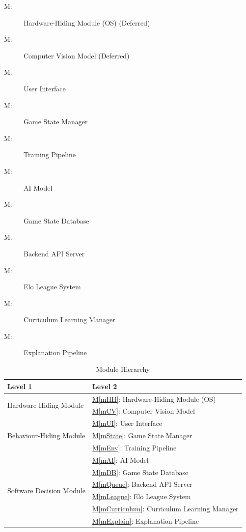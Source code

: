 \documentclass[12pt, titlepage]{article}
\newcounter{mnum}
\newcommand{\mthemnum}{M\themnum}
\newcommand{\mref}[1]{\hyperref[sec:#1]{M\ref*{#1}}}
\begin{document}
\begin{description}
\item [ \mthemnum \label{mHH}:] Hardware-Hiding Module (OS) (Deferred)
\item [ \mthemnum \label{mCV}:] Computer Vision Model (Deferred)
\item [ \mthemnum \label{mUI}:] User Interface
\item [ \mthemnum \label{mState}:] Game State Manager
\item [ \mthemnum \label{mEnv}:] Training Pipeline
\item [ \mthemnum \label{mAI}:] AI Model
\item [ \mthemnum \label{mDB}:] Game State Database
\item [ \mthemnum \label{mQueue}:] Backend API Server
\item [ \mthemnum \label{mLeague}:] Elo League System
\item [ \mthemnum \label{mCurriculum}:] Curriculum Learning Manager
\item [ \mthemnum \label{mExplain}:] Explanation Pipeline
\end{description}

\begin{table}[h!]
\centering
\caption{Module Hierarchy}
\label{TblMH}
\begin{tabular}{p{} p{}}
\toprule
\textbf{Level 1} & \textbf{Level 2}\\
\midrule

\multirow{2}{0.3\textwidth}{Hardware-Hiding Module}
& \mref{mHH}: Hardware-Hiding Module (OS) \\
& \mref{mCV}: Computer Vision Model \\
\midrule

\multirow{3}{0.3\textwidth}{Behaviour-Hiding Module}
& \mref{mUI}: User Interface \\
& \mref{mState}: Game State Manager \\
& \mref{mEnv}: Training Pipeline \\
\midrule

\multirow{6}{0.3\textwidth}{Software Decision Module}
& \mref{mAI}: AI Model \\
& \mref{mDB}: Game State Database \\
& \mref{mQueue}: Backend API Server \\
& \mref{mLeague}: Elo League System \\
& \mref{mCurriculum}: Curriculum Learning Manager \\
& \mref{mExplain}: Explanation Pipeline \\
\bottomrule
\end{tabular}
\end{table}
\end{document}
